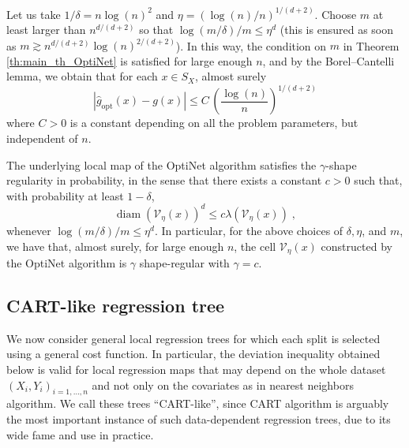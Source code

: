 \documentclass[paper=a4, fontsize=11pt]{scrartcl}
\newcommand{\diam}{\operatorname{diam}}
\newcommand{\PP}{\mathbb{P}}
\begin{document}
Let us take \(1/\delta = n \log(n)^2\) and \(\eta = (\log(n)/n)^{1/(d+2)}\). Choose $m$ at least larger than \(n^{d/(d+2)}\) so that $\log(m/\delta)/{m} \leq \eta^d$ (this is ensured as soon as \(m \gtrsim n^{d/(d+2)} \log(n)^{2/(d+2)}\)). In this way, the condition on $m$ in Theorem \ref{th:main_th_OptiNet} is satisfied for large enough $n$, and by the Borel–Cantelli lemma, we obtain that for each \(x \in S_X\), almost surely  
$$|\hat g_{\textrm{opt}} (x) - g(x) | \leq C \,  \left(\frac{ \log(n)}{n}  \right)^{1/(d+2)}$$  
where \(C > 0\) is a constant depending on all the problem parameters, but independent of $n$.

The underlying local map of the OptiNet algorithm  satisfies the $\gamma$-shape regularity in probability, in the sense that there exists a constant \(c > 0\) such that, with probability at least \(1 - \delta\),  
$$\diam(\mathcal V_\eta(x))^d  \leq c \lambda(\mathcal V_\eta(x))\;,$$
whenever $\log(m/\delta)/m \leq \eta^d.$
In particular, for the above choices of $\delta, \eta$, and $m$, we have that, 
almost surely, for large enough $n$, the cell \(\mathcal V_\eta(x)\) constructed by the OptiNet algorithm is $\gamma$ shape-regular with $\gamma = c$.


\subsection{CART-like regression tree}\label{s53}

We now consider general local regression trees for which each split is selected using a general cost function. In particular, the deviation inequality obtained below is valid for local regression maps that may depend on the whole dataset $(X_i,Y_i)_{i=1,\ldots,n }$ and not only on the covariates as in nearest neighbors algorithm. We call these trees ``CART-like'', since CART algorithm is arguably the most important instance of such data-dependent regression trees, due to its wide fame and use in practice. 
\end{document}
